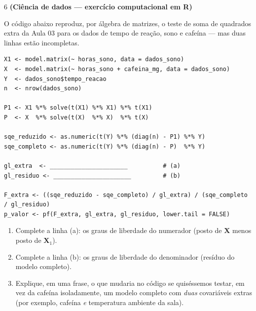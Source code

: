\documentclass[11pt]{article}
\begin{document}
\begin{questao}{6} \textbf{(Ciência de dados --- exercício computacional em R)}

O código abaixo reproduz, por álgebra de matrizes, o teste de soma de quadrados extra da Aula 03
para os dados de tempo de reação, sono e cafeína --- mas duas linhas estão incompletas.

\begin{lstlisting}
X1 <- model.matrix(~ horas_sono, data = dados_sono)
X  <- model.matrix(~ horas_sono + cafeina_mg, data = dados_sono)
Y  <- dados_sono$tempo_reacao
n  <- nrow(dados_sono)

P1 <- X1 %*% solve(t(X1) %*% X1) %*% t(X1)
P  <- X  %*% solve(t(X)  %*% X)  %*% t(X)

sqe_reduzido <- as.numeric(t(Y) %*% (diag(n) - P1) %*% Y)
sqe_completo <- as.numeric(t(Y) %*% (diag(n) - P)  %*% Y)

gl_extra  <- ______________________          # (a)
gl_residuo <- ______________________         # (b)

F_extra <- ((sqe_reduzido - sqe_completo) / gl_extra) / (sqe_completo / gl_residuo)
p_valor <- pf(F_extra, gl_extra, gl_residuo, lower.tail = FALSE)
\end{lstlisting}

\begin{enumerate}[label=(\alph*)]
  \item Complete a linha (a): os graus de liberdade do numerador (posto de $\mathbf{X}$ menos
    posto de $\mathbf{X}_1$).
  \item Complete a linha (b): os graus de liberdade do denominador (resíduo do modelo completo).
  \item Explique, em uma frase, o que mudaria no código se quiséssemos testar, em vez da
    cafeína isoladamente, um modelo completo com \emph{duas} covariáveis extras (por exemplo,
    cafeína \emph{e} temperatura ambiente da sala).
\end{enumerate}
\end{questao}
\end{document}
